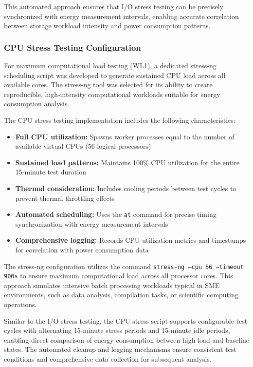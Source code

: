 This automated approach ensures that I/O stress testing can be precisely 
synchronized with energy measurement intervals, enabling accurate correlation 
between storage workload intensity and power consumption patterns.

\subsubsection{CPU Stress Testing Configuration}
For maximum computational load testing (WL1), a dedicated stress-ng scheduling 
script was developed to generate sustained CPU load across all available cores. 
The stress-ng tool was selected for its ability to create reproducible, 
high-intensity computational workloads suitable for energy consumption analysis.

The CPU stress testing implementation includes the following characteristics:
\begin{itemize}
    \item \textbf{Full CPU utilization:} Spawns worker processes equal to the 
    number of available virtual CPUs (56 logical processors)
    \item \textbf{Sustained load patterns:} Maintains 100\% CPU utilization 
    for the entire 15-minute test duration
    \item \textbf{Thermal consideration:} Includes cooling periods between test 
    cycles to prevent thermal throttling effects
    \item \textbf{Automated scheduling:} Uses the \texttt{at} command for 
    precise timing synchronization with energy measurement intervals
    \item \textbf{Comprehensive logging:} Records CPU utilization metrics and 
    timestamps for correlation with power consumption data
\end{itemize}

The stress-ng configuration utilizes the command 
\texttt{stress-ng --cpu 56 --timeout 900s} to ensure maximum computational 
load across all processor cores. This approach simulates intensive batch 
processing workloads typical in SME environments, such as data analysis, 
compilation tasks, or scientific computing operations.

Similar to the I/O stress testing, the CPU stress script supports configurable 
test cycles with alternating 15-minute stress periods and 15-minute idle 
periods, enabling direct comparison of energy consumption between high-load 
and baseline states. The automated cleanup and logging mechanisms ensure 
consistent test conditions and comprehensive data collection for subsequent 
analysis.

